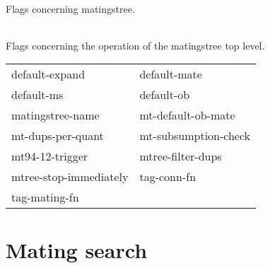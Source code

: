 \begin{description} 
\item[MTREE]  
Flags concerning matingstree.

\begin{tabular}{l l}
\end{tabular}

\item[MTREE-TOP]  
Flags concerning the operation of the matingstree top level.

\begin{tabular}{l l}
default-expand&default-mate\\
default-ms&default-ob\\
matingstree-name&mt-default-ob-mate\\
mt-dups-per-quant&mt-subsumption-check\\
mt94-12-trigger&mtree-filter-dups\\
mtree-stop-immediately&tag-conn-fn\\
tag-mating-fn
\end{tabular}
\item
\end{description}

\section{Mating search}

